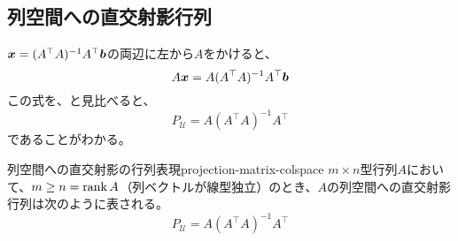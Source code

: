 \documentclass[../../../topic_linear-algebra]{subfiles}
\begin{document}
\subsection{列空間への直交射影行列}

$\vb*{x} = (A^\top A)^{-1}A^\top \vb*{b}$の両辺に左から$A$をかけると、
\begin{equation*}
  A\vb*{x} = A(A^\top A)^{-1}A^\top \vb*{b}
\end{equation*}
この式を、と見比べると、
\begin{equation*}
  P_{\mathcal{U}} = A(A^\top A)^{-1}A^\top
\end{equation*}
であることがわかる。

\begin{theorem}{列空間への直交射影の行列表現}{projection-matrix-colspace}
  $m \times n$型行列$A$において、$m \geq n = \rank A$（列ベクトルが線型独立）のとき、$A$の列空間への直交射影行列は次のように表される。
  \begin{equation*}
    P_{\mathcal{U}} = A(A^\top A)^{-1}A^\top
  \end{equation*}
\end{theorem}
\end{document}
